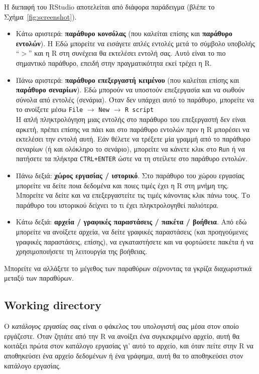 \documentclass[a4paper,11pt,twocolumn,tablecaptionabove]{scrartcl}
\begin{document}
Η διεπαφή του RStudio αποτελείται από διάφορα παράδειγμα (βλέπε το Σχήμα~\ref{fig:screenshot}).
\begin{itemize}
\item Κάτω αριστερά: \textbf{παράθυρο κονσόλας} (που καλείται επίσης και \textbf{παράθυρο εντολών}). H
Εδώ μπορείτε να εισάγετε απλές εντολές μετά το σύμβολο υποβολής ``$>$'' και η R στη συνέχεια θα εκτελέσει
εντολή σας. Αυτό είναι το πιο σημαντικό παράθυρο, επειδή στην πραγματικότητα εκεί τρέχει η R.
\item Πάνω αριστερά: \textbf{παράθυρο επεξεργαστή κειμένου} (που καλείται επίσης και \textbf{παράθυρο σεναρίων}).
Εδώ μπορούν να υποστούν επεξεργασία και να σωθούν σύνολα από εντολές (σενάρια). Όταν δεν υπάρχει αυτό το
παράθυρο, μπορείτε να το ανοίξετε μέσω \texttt{File} $\rightarrow$ \texttt{New} $\rightarrow$ \texttt{R script}\\
Η απλή πληκτρολόγηση μιας εντολής στο παράθυρο του επεξεργαστή δεν είναι αρκετή, πρέπει επίσης να πάει και στο
παράθυρο εντολών πριν η R μπορέσει να εκτελέσει την εντολή αυτή. Εάν θέλετε να τρέξετε μία γραμμή από το 
παράθυρο σεναρίων (ή και ολόκληρο το σενάριο), μπορείτε να κάνετε κλικ στο \texttt{Run} ή να πατήσετε τα
πλήκτρα \texttt{CTRL+ENTER} ώστε να τη στείλετε στο παράθυρο εντολών. 
\item Πάνω δεξιά: \textbf{χώρος εργασίας / ιστορικό}. Στο παράθυρο του χώρου εργασίας
μπορείτε να δείτε ποια δεδομένα και ποιες τιμές έχει η R στη μνήμη της. Μπορείτε να δείτε και να επεξεργαστείτε
τις τιμές κάνοντας κλικ πάνω τους. Το παράθυρο του ιστορικού δείχνει το τι έχει πληκτρολογηθεί παλιότερα. 
\item Κάτω δεξιά: \textbf{αρχεία / γραφικές παραστάσεις / πακέτα / βοήθεια}. Από εδώ μπορείτε να ανοίξετε
αρχεία, να δείτε γραφικές παραστάσεις (και προηγούμενες γραφικές παραστάσεις, επίσης), να εγκαταστήσετε
και να φορτώσετε πακέτα ή να χρησιμοποιήσετε τη λειτουργία της βοήθειας.
\end{itemize}

Μπορείτε να αλλάξετε το μέγεθος των παραθύρων σέρνοντας τα γκρίζα διαχωριστικά μεταξύ των παραθύρων.

\subsection{Working directory}

Ο \emph{κατάλογος εργασίας} σας είναι ο φάκελος του υπολογιστή σας μέσα στον οποίο εργάζεστε. Όταν ζητάτε από
την R να ανοίξει ένα συγκεκριμένο αρχείο, αυτή θα κοιτάξει πρώτα στον κατάλογο εργασίας γι' αυτό το αρχείο, και
όταν πείτε στην R να αποθηκεύσει ένα αρχείο δεδομένων ή ένα γράφημα, αυτή θα το αποθηκεύσει στον κατάλογο
εργασίας.
\end{document}
